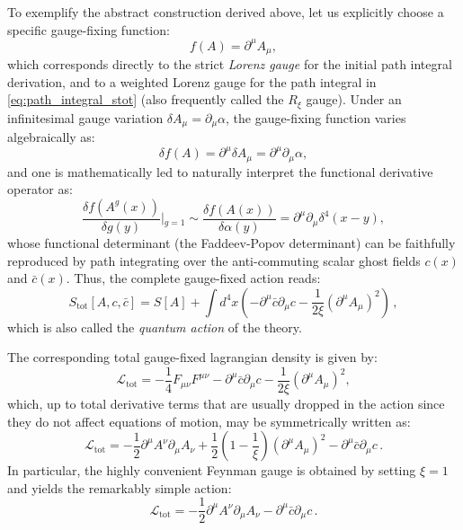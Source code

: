 \begin{example}
    To exemplify the abstract construction derived above, let us explicitly choose a specific gauge-fixing function:
    \begin{equation} \label{eq:lorenz_gauge_function}
        f(A) = \partial^\mu A_\mu,
    \end{equation}
    which corresponds directly to the strict \textit{Lorenz gauge} for the initial path integral derivation, and to a weighted Lorenz gauge for the path integral in \eqref{eq:path_integral_stot} (also frequently called the \(R_\xi\) gauge). Under an infinitesimal gauge variation \(\delta A_\mu = \partial_\mu \alpha\), the gauge-fixing function varies algebraically as:
    \[
        \delta f(A) = \partial^\mu \delta A_\mu = \partial^\mu \partial_\mu \alpha,
    \]
    and one is mathematically led to naturally interpret the functional derivative operator as:
    \[
        \frac{\delta f(A^g(x))}{\delta g(y)}\Bigg\vert{}_{g=1} \sim \frac{\delta f(A(x))}{\delta \alpha(y)} = \partial^\mu \partial_\mu \delta^4(x - y),
    \]
    whose functional determinant (the Faddeev-Popov determinant) can be faithfully reproduced by path integrating over the anti-commuting scalar ghost fields \(c(x)\) and \(\bar{c}(x)\). Thus, the complete gauge-fixed action reads:
    \begin{equation} \label{eq:stot_abelian}
        S_{\text{tot}}[A, c, \bar{c}] = S[A] + \int d^4x \left( -\partial^\mu \bar{c} \partial_\mu c - \frac{1}{2\xi} (\partial^\mu A_\mu)^2 \right) \, ,
    \end{equation}
    which is also called the \textit{quantum action} of the theory.

    The corresponding total gauge-fixed lagrangian density is given by:
    \begin{equation} \label{eq:ltot_abelian}
        \mathcal{L}_{\text{tot}} = -\frac{1}{4}F_{\mu\nu}F^{\mu\nu} - \partial^\mu \bar{c} \partial_\mu c - \frac{1}{2\xi}(\partial^\mu A_\mu)^2,
    \end{equation}
    which, up to total derivative terms that are usually dropped in the action since they do not affect equations of motion, may be symmetrically written as:
    \begin{equation} \label{eq:ltot_symmetric}
        \mathcal{L}_{\text{tot}} = -\frac{1}{2}\partial^\mu A^\nu \partial_\mu A_\nu + \frac{1}{2}\left(1 - \frac{1}{\xi}\right)(\partial^\mu A_\mu)^2 - \partial^\mu \bar{c} \partial_\mu c \, .
    \end{equation}
    In particular, the highly convenient Feynman gauge is obtained by setting \(\xi = 1\) and yields the remarkably simple action:
    \begin{equation} \label{eq:ltot_feynman}
        \mathcal{L}_{\text{tot}} = -\frac{1}{2}\partial^\mu A^\nu \partial_\mu A_\nu - \partial^\mu \bar{c} \partial_\mu c \, .
    \end{equation}


\end{example}
